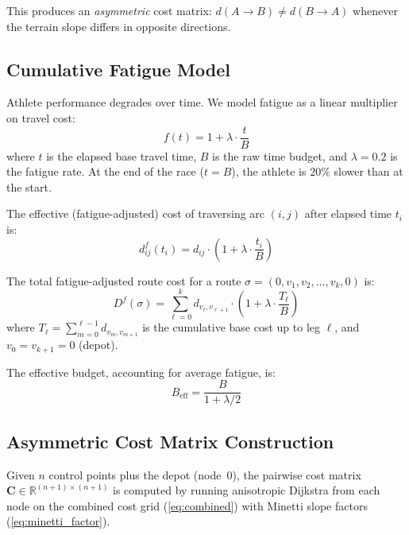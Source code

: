 \documentclass[11pt,a4paper]{article}
\begin{document}
This produces an \emph{asymmetric} cost matrix: $d(A \to B) \neq d(B \to A)$ whenever the terrain slope differs in opposite directions.

\subsection{Cumulative Fatigue Model}
\label{sec:fatigue}

Athlete performance degrades over time.
We model fatigue as a linear multiplier on travel cost:
\begin{equation}
  f(t) = 1 + \lambda \cdot \frac{t}{B}
  \label{eq:fatigue}
\end{equation}
where $t$ is the elapsed base travel time, $B$ is the raw time budget, and $\lambda = 0.2$ is the fatigue rate.
At the end of the race ($t = B$), the athlete is $20\%$ slower than at the start.

The effective (fatigue-adjusted) cost of traversing arc $(i,j)$ after elapsed time $t_i$ is:
\begin{equation}
  d^f_{ij}(t_i) = d_{ij} \cdot \left(1 + \lambda \cdot \frac{t_i}{B}\right)
  \label{eq:fatigue_cost}
\end{equation}

The total fatigue-adjusted route cost for a route $\sigma = (0, v_1, v_2, \ldots, v_k, 0)$ is:
\begin{equation}
  D^f(\sigma) = \sum_{\ell=0}^{k} d_{v_\ell, v_{\ell+1}} \cdot \left(1 + \lambda \cdot \frac{T_\ell}{B}\right)
  \label{eq:total_fatigue}
\end{equation}
where $T_\ell = \sum_{m=0}^{\ell-1} d_{v_m, v_{m+1}}$ is the cumulative base cost up to leg $\ell$, and $v_0 = v_{k+1} = 0$ (depot).

The effective budget, accounting for average fatigue, is:
\begin{equation}
  B_{\text{eff}} = \frac{B}{1 + \lambda/2}
  \label{eq:bud_eff}
\end{equation}

\subsection{Asymmetric Cost Matrix Construction}
\label{sec:costmatrix}

Given $n$ control points plus the depot (node~0), the pairwise cost matrix $\mathbf{C} \in \mathbb{R}^{(n+1) \times (n+1)}$ is computed by running anisotropic Dijkstra from each node on the combined cost grid (\cref{eq:combined}) with Minetti slope factors (\cref{eq:minetti_factor}).
\end{document}
